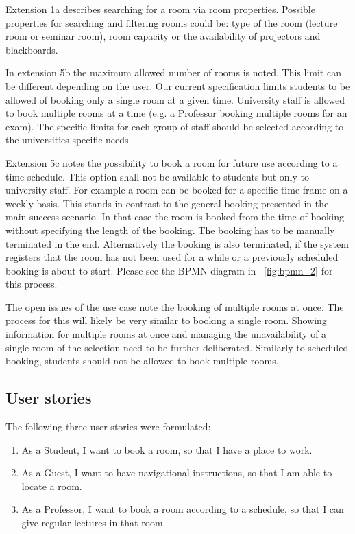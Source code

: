 \documentclass[conference,onecolumn]{IEEEtran}
\begin{document}
Extension 1a describes searching for a room via room properties.
Possible properties for searching and filtering rooms could be: type of the room (lecture room or seminar room), room capacity or the availability of projectors and blackboards.

In extension 5b the maximum allowed number of rooms is noted. This limit can be different depending on the user. Our current specification limits students to be allowed of booking only a single room at a given time. University staff is allowed to book multiple rooms at a time (e.g. a Professor booking multiple rooms for an exam). The specific limits for each group of staff should be selected according to the universities specific needs.

Extension 5c notes the possibility to book a room for future use according to a time schedule. This option shall not be available to students but only to university staff. For example a room can be booked for a specific time frame on a weekly basis.
This stands in contrast to the general booking presented in the main success scenario. In that case the room is booked from the time of booking without specifying the length of the booking. The booking has to be manually terminated in the end. Alternatively the booking is also terminated, if the system registers that the room has not been used for a while or a previously scheduled booking is about to start. Please see the BPMN diagram in \figurename~\ref{fig:bpmn_2} for this process.

The open issues of the use case note the booking of multiple rooms at once.
The process for this will likely be very similar to booking a single room. Showing information for multiple rooms at once and managing the unavailability of a single room of the selection need to be further deliberated. Similarly to scheduled booking, students should not be allowed to book multiple rooms.

\subsection{User stories}

The following three user stories were formulated:

\begin{enumerate}
	\item As a Student, I want to book a room, so that I have a place to work.
	\item As a Guest, I want to have navigational instructions, so that I am able to locate a room.
	\item As a Professor, I want to book a room according to a schedule, so that I can give regular lectures in that room.
\end{enumerate}
\end{document}
